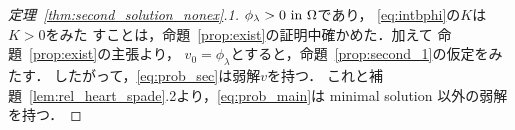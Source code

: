 \begin{proof}[定理~\ref{thm:second_solution_nonex}.1]
 $\phi_\lambda > 0 ~\text{in}~ \Omega$であり，
 \eqref{eq:intbphi}の$K$は$K > 0$をみた
 すことは，命題~\ref{prop:exist}の証明中確かめた．加えて
 命題~\ref{prop:exist}の主張より，
 $v_0 = \phi_\lambda$とすると，命題~\ref{prop:second_1}の仮定をみたす．
 したがって，\ref{eq:prob_sec}は弱解$v$を持つ．
 これと補題~\ref{lem:rel_heart_spade}.2より，\ref{eq:prob_main}は
 minimal solution 以外の弱解を持つ． \qedhere
\end{proof}

